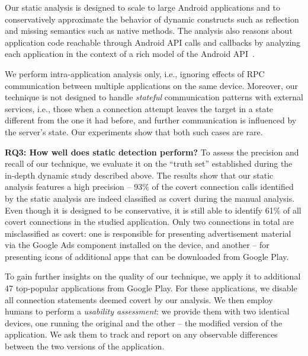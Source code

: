 
Our static analysis is designed to scale to large Android applications
and to conservatively approximate the behavior of dynamic constructs
such as reflection and missing semantics such as native methods.  The
analysis also reasons about application code reachable through Android
API calls and callbacks by analyzing each application in the context
of a rich model of the Android
API~\cite{Gordon:Kim:Perkins:Gilham:Nguyen:Rinard:NDSS15}. 

We perform intra-application analysis only, i.e., ignoring effects of RPC communication between multiple applications on the same device. Moreover, our technique is not designed to handle
\emph{stateful} communication patterns with external services, i.e., those when a connection attempt leaves the target in a state different from the one it had before, and further communication is influenced by the server's state. Our experiments show that both such cases are rare. 

\noindent 
{\bf RQ3: How well does static detection perform?}
To assess the precision and recall of our technique, we evaluate it on the ``truth set'' established during the in-depth dynamic study described above. %
The results show that our static analysis features a high precision -- 93\% of the covert connection calls identified by the static analysis are indeed classified as covert during the manual analysis. Even though it is designed to be conservative, it is still able to identify 61\% of all covert connections in the studied application.
Only two connections in total are misclassified as covert: one is responsible for presenting advertisement material via the Google Ads component installed on the device, and another -- for presenting icons of additional apps that can be downloaded from Google Play. 

To gain further insights on the quality of our technique, we apply it to additional 47 top-popular applications from Google Play. For these applications, we disable all connection statements deemed covert by our analysis. We then employ humans to perform a \emph{usability assessment}: we provide them with two identical devices, one running the original and the other -- the modified version of the application. We ask them to track and report on any observable differences between the two versions of the application. 

